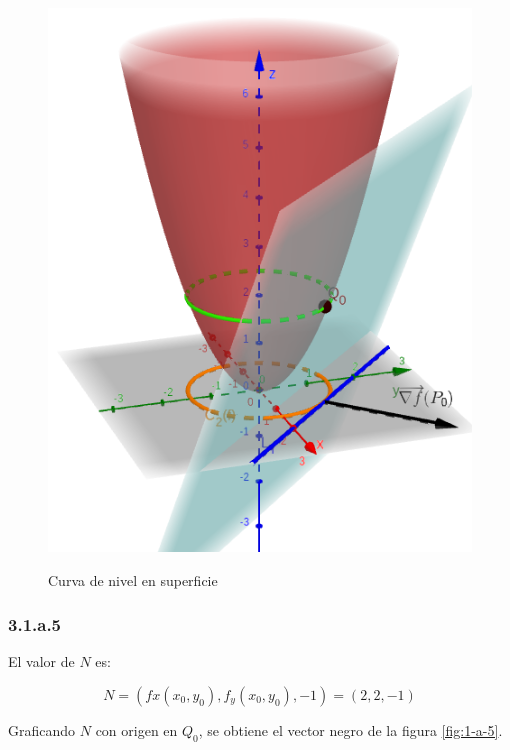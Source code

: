 \documentclass{article}
\begin{document}
\begin{figure}[ht]
\caption{Curva de nivel en superficie}
\includegraphics[scale=0.35]{img/ejercicios/3/1-a-4.png} 
\centering
\label{fig:1-a-4}
\end{figure}

\subsubsection*{3.1.a.5}
\label{subsubsec:3.1.a.5}

El valor de $N$ es:

\begin{equation}
N = (fx(x_0,y_0), f_y(x_0,y_0), -1) = (2, 2, -1)
\end{equation}

Graficando $N$ con origen en $Q_0$, se obtiene el vector negro de la figura \ref{fig:1-a-5}.
\end{document}
